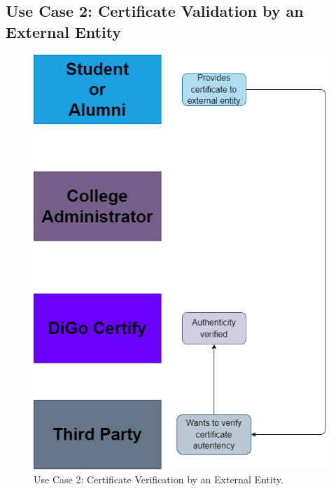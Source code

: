 \subsection{Use Case 2: Certificate Validation by an External Entity}

\begin{figure}[H]
    \centering
    \includegraphics[height=0.6\textwidth, keepaspectratio]{final-report/assets/certificate-validation.drawio.png}
    \caption{Use Case 2: Certificate Verification by an External Entity.}
    \label{fig:use-case-2}
\end{figure}

